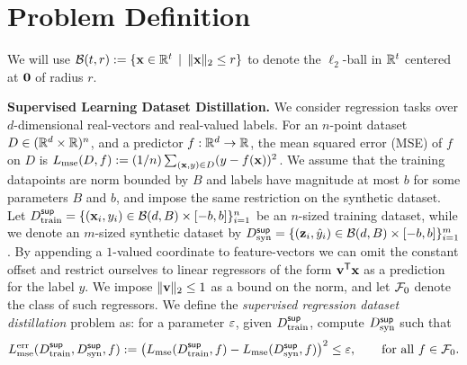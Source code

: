 \section{Problem Definition}\label{sec:problem_sup}
We will use $\mathcal{B}(t, r) := \{{\mathbf{x}} \in \mathbb{R}^t\,\mid\,\|{\mathbf{x}}\|_2 \leq r\}$  to denote the $\ell_2$-ball in $\mathbb{R}^t$ centered at $\mathbf{0}$ of radius $r$. 

{\bf Supervised Learning Dataset Distillation.} 
We consider regression tasks over $d$-dimensional real-vectors and real-valued labels. For an $n$-point dataset $D \in (\mathbb{R}^d\times \mathbb{R})^n$, and a predictor $f : \mathbb{R}^d \to \mathbb{R}$, the mean squared error (MSE) of $f$ on $D$ is $L_{\textnormal{mse}}(D, f) := (1/n)\sum_{({\mathbf{x}},y)\in D}(y - f({\mathbf{x}}))^2$. We assume that the training datapoints are norm bounded by $B$ and labels have magnitude at most $b$ for some parameters $B$ and $b$, and impose the same restriction on the synthetic dataset.
Let $D^{\sf sup}_{\textnormal{train}} = \{({\mathbf{x}}_i, y_i) \in \mathcal{B}(d,B) \times [-b,b]\}_{i=1}^n$ be an $n$-sized training dataset, while we denote an $m$-sized synthetic dataset by $D^{\sf sup}_{\textnormal{syn}} = \{({\mathbf{z}}_i, \hat{y}_i)\in \mathcal{B}(d,B) \times [-b,b]\}_{i=1}^m$. 
By appending a $1$-valued coordinate to feature-vectors we can omit the constant offset and restrict ourselves to linear regressors of the form ${\mathbf{v}}^{\sf T}{\mathbf{x}}$ as a prediction for the label $y$. We impose $\|{\mathbf{v}}\|_2 \leq 1$ as a bound on the norm, and let $\mathcal{F}_0$ denote the class of such regressors. %
We define the \textit{supervised regression dataset distillation} problem as: for a parameter ${\varepsilon}$, given $D^{\sf sup}_{\textnormal{train}}$, compute $D^{\sf sup}_{\textnormal{syn}}$ such that
\begin{equation}
    L^{\textnormal{err}}_{\textnormal{mse}}(D^{\sf sup}_{\textnormal{train}}, D^{\sf sup}_{\textnormal{syn}}, f) := \left(L_{\textnormal{mse}}(D^{\sf sup}_{\textnormal{train}}, f) - L_{\textnormal{mse}}(D^{\sf sup}_{\textnormal{syn}}, f)\right)^2 \leq {\varepsilon}, \qquad  \textnormal{for all } f \in \mathcal{F}_0. \label{eqn:errMSEloss}  
\end{equation}


